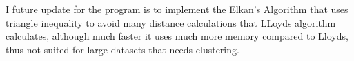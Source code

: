 \documentclass[12pt]{report}
\begin{document}
I future update for the program is to implement the Elkan's Algorithm that uses triangle inequality to avoid many distance calculations that LLoyds algorithm calculates, although much faster it uses much more memory compared to Lloyds, thus not suited for large datasets that needs clustering.


\newpage

\end{document}
